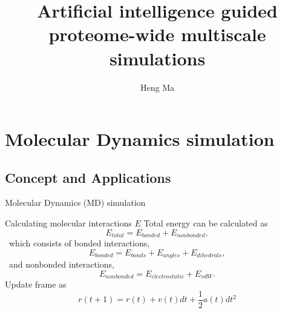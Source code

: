 \documentclass{beamer}
\title{Artificial intelligence guided proteome-wide multiscale simulations}
\author{Heng Ma}
\institute{Oak Ridge National Laboratory\\ Oak Ridge, Tennessee 37830}
\date{}
\begin{document}
\begin{frame}
  \titlepage
\end{frame}

\begin{frame}
  \tableofcontents
\end{frame}



\section{Molecular Dynamics simulation }

\subsection{Concept and Applications}

\begin{frame}{Molecular Dynamics (MD) simulation}
\centering
{}
\end{frame}

\begin{frame}{Calculating molecular interactions $E$}
Total energy can be calculated as
\begin{equation}
E_{total} = E_{bonded} + E_{nonbonded}, 
\end{equation}
\ which consists of bonded interactions, 
\begin{equation} 
E_{bonded} = E_{bonds} + E_{angles} + E_{dihedrals}, 
\end{equation}
\ and nonbonded interactions, 
\begin{equation}
E_{nonbonded} = E_{electrostatic} + E_{vdW}. 
\end{equation}
Update frame as 
\begin{equation}
r(t+1) = r(t) + v(t) dt + \frac{1}{2} a(t) dt^2
\end{equation}
\end{frame}
\end{document}
